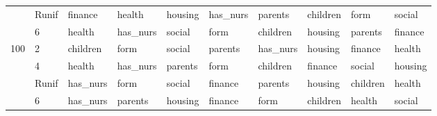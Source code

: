 \begin{table}[htbp]
\begin{tabular}{llllllllll}
 & Runif & finance & health & housing & has_nurs & parents & children & form & social \\
 & 6 & health & has_nurs & social & form & children & housing & parents & finance \\
\multirow[c]{4}{*}{100} & 2 & children & form & social & parents & has_nurs & housing & finance & health \\
 & 4 & health & has_nurs & parents & form & children & finance & social & housing \\
 & Runif & has_nurs & form & social & finance & parents & housing & children & health \\
 & 6 & has_nurs & parents & housing & finance & form & children & health & social \\
\bottomrule
\end{tabular}
\end{table}
